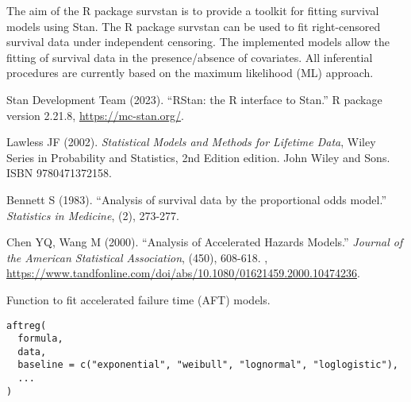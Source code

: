 \documentclass[letterpaper]{book}
\begin{document}
%
\begin{Description}\relax
The aim of the R package survstan is to provide a toolkit for fitting survival models using Stan. The R package survstan can be used to fit right-censored survival data under independent censoring. The implemented models allow the fitting of survival data in the presence/absence of covariates. All inferential procedures are currently based on the maximum likelihood (ML) approach.
\end{Description}
%
\begin{References}\relax
Stan Development Team (2023).
``RStan: the R interface to Stan.''
R package version 2.21.8, \url{https://mc-stan.org/}.

Lawless JF (2002).
\emph{Statistical Models and Methods for Lifetime Data},  Wiley Series in Probability and Statistics, 2nd Edition edition.
John Wiley and Sons.
ISBN 9780471372158.

Bennett S (1983).
``Analysis of survival data by the proportional odds model.''
\emph{Statistics in Medicine}, (2), 273-277.

Chen YQ, Wang M (2000).
``Analysis of Accelerated Hazards Models.''
\emph{Journal of the American Statistical Association}, (450), 608-618.
, \url{https://www.tandfonline.com/doi/abs/10.1080/01621459.2000.10474236}.
\end{References}
%
\begin{Description}\relax
Function to fit accelerated failure time (AFT)  models.
\end{Description}
%
\begin{Usage}
\begin{verbatim}
aftreg(
  formula,
  data,
  baseline = c("exponential", "weibull", "lognormal", "loglogistic"),
  ...
)
\end{verbatim}
\end{Usage}
%
\end{document}

